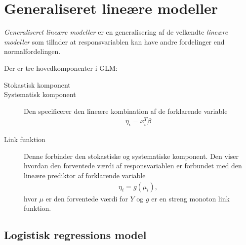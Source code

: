 \section{Generaliseret lineære modeller}
\textit{Generaliseret lineære modeller} er en generalisering af de velkendte \textit{lineære modeller} som tillader at responsvariablen kan have andre fordelinger end normalfordelingen.

Der er tre hovedkomponenter i GLM:
\begin{description}
\item[Stokastisk komponent] 

\item[Systematisk komponent] 
Den specificerer den lineære kombination af de forklarende variable
\begin{align*}
\eta_i = x_i^T \beta
\end{align*}
\item[Link funktion]
Denne forbinder den stokastiske og systematiske komponent. Den viser hvordan den forventede værdi af responsvariablen er forbundet med den lineære prediktor af forklarende variable
\begin{align*}
\eta_i=g(\mu_i),
\end{align*} 
hvor $\mu$ er den forventede værdi for $Y$ og $g$ er en streng monoton link funktion.
\end{description}

\subsection{Logistisk regressions model}
